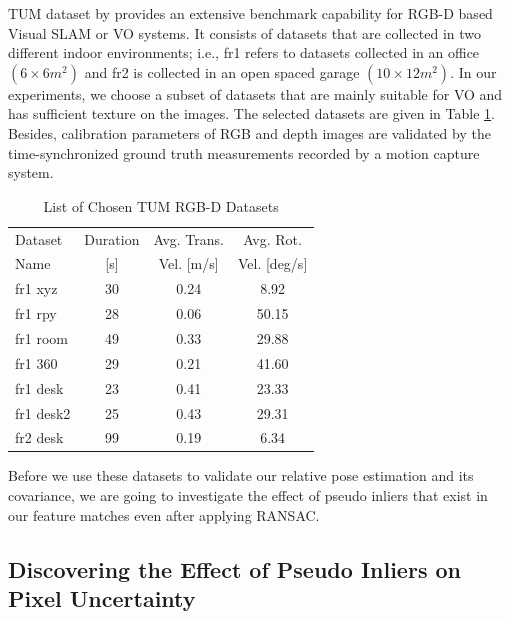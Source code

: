 \documentclass[a4paper]{report}
\numberwithin{figure}{section}
\begin{document}
TUM dataset by \parencite{Sturm2012a} provides an extensive benchmark 
capability for RGB-D based Visual SLAM or VO systems. It consists of datasets 
that are collected in two different indoor environments; i.e., fr1 refers to 
datasets collected in an office $(6\times 6 m^2)$ and fr2 is collected in an 
open spaced garage $(10\times 12m^2)$. In our experiments, we choose a subset 
of datasets that are mainly suitable for VO and has sufficient texture on the 
images.  The selected datasets are given in Table \ref{tb:tum_dataset}.  
Besides, calibration parameters of RGB and depth images are validated by the 
time-synchronized ground truth measurements recorded by a motion capture 
system.

\begin{table}
\begin{center}
  \begin{tabular}{lccc}
    \hline
    Dataset & Duration & Avg. Trans. & Avg. Rot.\\
     Name & [s] & Vel. [m/s] & Vel. [deg/s]\\
    \hline
    fr1 xyz   & 30 & 0.24 & 8.92\\
    fr1 rpy   & 28 & 0.06 & 50.15\\
    fr1 room  & 49 & 0.33 & 29.88\\
    fr1 360   & 29 & 0.21 & 41.60\\
    fr1 desk  & 23 & 0.41 & 23.33\\
    fr1 desk2 & 25 & 0.43 & 29.31\\
    fr2 desk  & 99 & 0.19 & 6.34\\
    \hline
  \end{tabular}
\end{center}
  \caption{List of Chosen TUM RGB-D Datasets}
  \label{tb:tum_dataset}
\end{table}

Before we use these datasets to validate 
our relative pose estimation and its covariance, 
we are going to investigate the effect of pseudo inliers that 
exist in our feature matches even after applying RANSAC. 

\subsection{Discovering the Effect of Pseudo Inliers on Pixel Uncertainty}\label{sc_pseudo_inliers}
\end{document}
